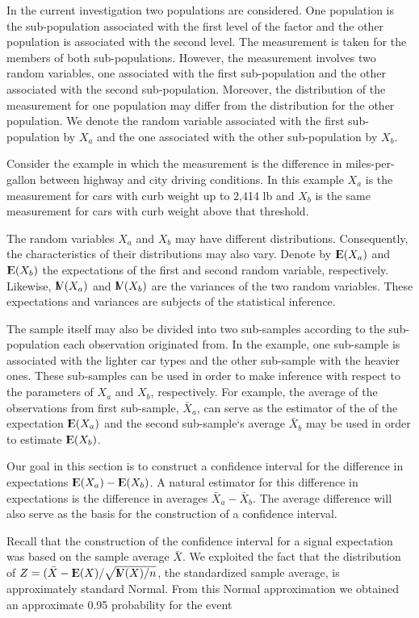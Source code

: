 \documentclass[]{krantz}
\newcommand{\Expec}{{\rm I\kern-.3em E}}
\newcommand{\Var}{{\rm I\kern-.3em V}}
\theoremstyle{definition}
\theoremstyle{definition}
\theoremstyle{definition}
\theoremstyle{remark}
\begin{document}
In the current investigation two populations are considered. One
population is the sub-population associated with the first level of the
factor and the other population is associated with the second level. The
measurement is taken for the members of both sub-populations. However,
the measurement involves two random variables, one associated with the
first sub-population and the other associated with the second
sub-population. Moreover, the distribution of the measurement for one
population may differ from the distribution for the other population. We
denote the random variable associated with the first sub-population by
\(X_a\) and the one associated with the other sub-population by \(X_b\).

Consider the example in which the measurement is the difference in
miles-per-gallon between highway and city driving conditions. In this
example \(X_a\) is the measurement for cars with curb weight up to 2,414
lb and \(X_b\) is the same measurement for cars with curb weight above
that threshold.

The random variables \(X_a\) and \(X_b\) may have different distributions.
Consequently, the characteristics of their distributions may also vary.
Denote by \(\Expec(X_a)\) and \(\Expec(X_b)\) the expectations of the first
and second random variable, respectively. Likewise, \(\Var(X_a)\) and
\(\Var(X_b)\) are the variances of the two random variables. These
expectations and variances are subjects of the statistical inference.

The sample itself may also be divided into two sub-samples according to
the sub-population each observation originated from. In the example, one
sub-sample is associated with the lighter car types and the other
sub-sample with the heavier ones. These sub-samples can be used in order
to make inference with respect to the parameters of \(X_a\) and \(X_b\),
respectively. For example, the average of the observations from first
sub-sample, \(\bar X_a\), can serve as the estimator of the of the
expectation \(\Expec(X_a)\) and the second sub-sample`s average \(\bar X_b\)
may be used in order to estimate \(\Expec(X_b)\).

Our goal in this section is to construct a confidence interval for the
difference in expectations \(\Expec(X_a)-\Expec(X_b)\). A natural
estimator for this difference in expectations is the difference in
averages \(\bar X_a- \bar X_b\). The average difference will also serve as
the basis for the construction of a confidence interval.

Recall that the construction of the confidence interval for a signal
expectation was based on the sample average \(\bar X\). We exploited the
fact that the distribution of
\(Z = (\bar X - \Expec(X)/\sqrt{\Var(X)/n}\), the standardized sample
average, is approximately standard Normal. From this Normal
approximation we obtained an approximate 0.95 probability for the event
\end{document}
